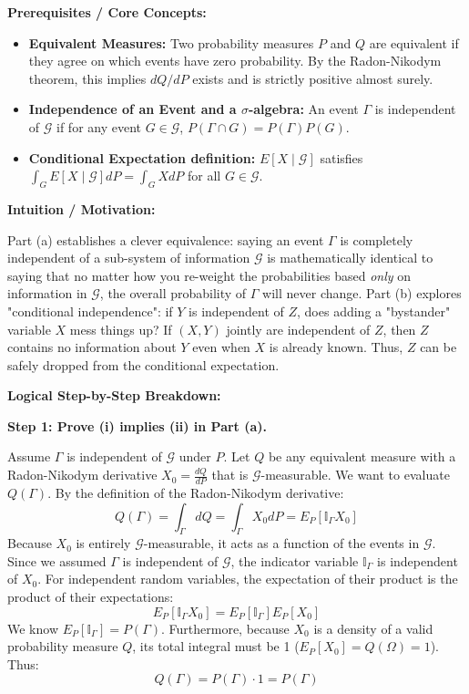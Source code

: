 \begin{solution}
\textbf{Prerequisites / Core Concepts:}
\begin{itemize}
    \item \textbf{Equivalent Measures:} Two probability measures $P$ and $Q$ are equivalent if they agree on which events have zero probability. By the Radon-Nikodym theorem, this implies $dQ/dP$ exists and is strictly positive almost surely.
    \item \textbf{Independence of an Event and a $\sigma$-algebra:} An event $\Gamma$ is independent of $\mathcal{G}$ if for any event $G \in \mathcal{G}$, $P(\Gamma \cap G) = P(\Gamma)P(G)$.
    \item \textbf{Conditional Expectation definition:} $E[X \mid \mathcal{G}]$ satisfies $\int_G E[X \mid \mathcal{G}] dP = \int_G X dP$ for all $G \in \mathcal{G}$.
\end{itemize}

\textbf{Intuition / Motivation:}

Part (a) establishes a clever equivalence: saying an event $\Gamma$ is completely independent of a sub-system of information $\mathcal{G}$ is mathematically identical to saying that no matter how you re-weight the probabilities based \textit{only} on information in $\mathcal{G}$, the overall probability of $\Gamma$ will never change. Part (b) explores "conditional independence": if $Y$ is independent of $Z$, does adding a "bystander" variable $X$ mess things up? If $(X,Y)$ jointly are independent of $Z$, then $Z$ contains no information about $Y$ even when $X$ is already known. Thus, $Z$ can be safely dropped from the conditional expectation.

\textbf{Logical Step-by-Step Breakdown:}

\textbf{Step 1: Prove (i) implies (ii) in Part (a).}

Assume $\Gamma$ is independent of $\mathcal{G}$ under $P$. Let $Q$ be any equivalent measure with a Radon-Nikodym derivative $X_0 = \frac{dQ}{dP}$ that is $\mathcal{G}$-measurable.
We want to evaluate $Q(\Gamma)$. By the definition of the Radon-Nikodym derivative:
\[ Q(\Gamma) = \int_\Gamma dQ = \int_\Gamma X_0 dP = E_P[\mathbb{I}_\Gamma X_0] \]
Because $X_0$ is entirely $\mathcal{G}$-measurable, it acts as a function of the events in $\mathcal{G}$. Since we assumed $\Gamma$ is independent of $\mathcal{G}$, the indicator variable $\mathbb{I}_\Gamma$ is independent of $X_0$.
For independent random variables, the expectation of their product is the product of their expectations:
\[ E_P[\mathbb{I}_\Gamma X_0] = E_P[\mathbb{I}_\Gamma] E_P[X_0] \]
We know $E_P[\mathbb{I}_\Gamma] = P(\Gamma)$. Furthermore, because $X_0$ is a density of a valid probability measure $Q$, its total integral must be 1 ($E_P[X_0] = Q(\Omega) = 1$).
Thus:
\[ Q(\Gamma) = P(\Gamma) \cdot 1 = P(\Gamma) \]


\end{solution}
